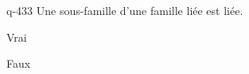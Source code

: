 \begin{truefalse}{q-433}
Une sous-famille d'une famille liée est liée.
\item Vrai
\item* Faux
\end{truefalse}

